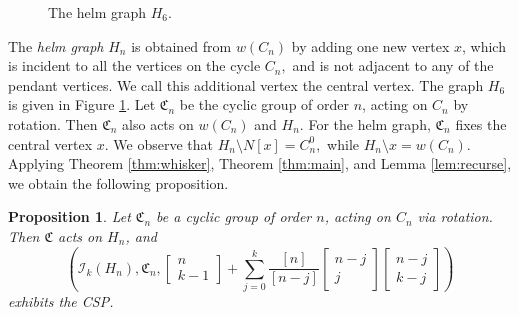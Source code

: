 \documentclass[12pt]{article}
\newtheorem{proposition}[theorem]{Proposition}
\theoremstyle{definition}
\newcommand{\gau}[2]{\left[ \begin{array}{c} #1 \\ #2 \end{array} \right]}
\begin{document}
\begin{figure}
\begin{center}
\caption{The helm graph $H_6$.}
\label{fig:helm}
\end{center}
\end{figure}

The \emph{helm graph} $H_n$ is obtained from $w(C_n)$ by adding one new vertex $x$, which is incident to all the vertices on the cycle $C_n,$ and is not adjacent to any of the pendant vertices. We call this additional vertex the central vertex. The graph $H_6$ is given in Figure \ref{fig:helm}. Let $\mathfrak{C}_n$ be the cyclic group of order $n$, acting on $C_n$ by rotation. Then $\mathfrak{C}_n$ also acts on $w(C_n)$ and $H_n$. For the helm graph, $\mathfrak{C}_n$ fixes the central vertex $x$. We observe that $H_n \setminus N[x] = C_n^0,$ while $H_n \setminus x = w(C_n)$. Applying Theorem \ref{thm:whisker}, Theorem \ref{thm:main}, and Lemma \ref{lem:recurse}, we obtain the following proposition.

\begin{proposition}
Let $\mathfrak{C}_n$ be a cyclic group of order $n$, acting on $C_n$ via rotation. Then $\mathfrak{C}$ acts on $H_n$, and \[\left(\mathcal{I}_k(H_n), \mathfrak{C}_n, \gau{n}{k-1}+\sum_{j=0}^k \frac{[n]}{[n-j]}\gau{n-j}{j}\gau{n-j}{k-j} \right)\] exhibits the CSP.
\end{proposition}
\end{document}
